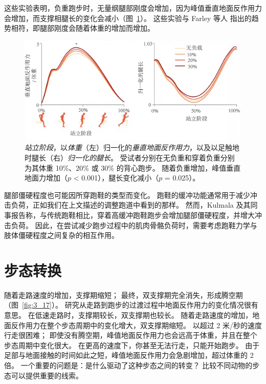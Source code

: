这些实验表明，负重跑步时，无量纲腿部刚度会增加，因为峰值垂直地面反作用力会增加，而支撑相腿长的变化会减小（图~\ref{fig:3_16}）。
这些实验与 Farley 等人\cite{farley1993running} 指出的趋势相符，即腿部刚度会随着体重的增加而增加。

\begin{figure}[!htb]
	\centering
	\includegraphics[width=1.0\linewidth]{chap3/3_16}
	\caption{\textit{站立阶段}，以\textit{体重}（左）归一化的\textit{垂直地面反作用力}，以及以足触地时腿长（右）\textit{归一化的腿长}。
		受试者分别在无负重和穿着负重分别为其体重 10\%、20\% 或 30\% 的背心跑步。
		随着负重增加，峰值垂直地面力增加（$p$ < 0.001），腿长变化减小（$p$ = 0.025）\cite{silder2015running}。 \label{fig:3_16}}
\end{figure}

腿部僵硬程度也可能因所穿跑鞋的类型而变化。
跑鞋的缓冲功能通常用于减少冲击负荷，正如我们在上文描述的调整跑道中看到的那样。
然而，Kulmala 及其同事\cite{kulmala2018running}报告称，与传统跑鞋相比，穿着高缓冲跑鞋跑步会增加腿部僵硬程度，并增大冲击负荷。
因此，在尝试减少跑步过程中的肌肉骨骼负荷时，需要考虑跑鞋力学与肢体僵硬程度之间复杂的相互作用。


\section{步态转换}

随着走路速度的增加，支撑期缩短；
最终，双支撑期完全消失，形成腾空期（图~\ref{fig:3_17}）。
研究从走路到跑步的过渡过程中地面反作用力的变化情况很有意思。
在低速走路时，支撑期较长，双支撑期也较长。
随着走路速度的增加，地面反作用力在整个步态周期中的变化增大，双支撑期缩短。
以超过 2 米/秒的速度行走很困难；
即使没有腾空期，峰值地面反作用力也会远高于体重，并且在整个步态周期中变化很大。
在更高的速度下，你甚至无法行走，只能开始跑步。
由于足部与地面接触的时间如此之短，峰值地面反作用力会急剧增加，超过体重的 2 倍。
一个重要的问题是：是什么驱动了这种步态之间的转变？
比较不同动物的步态可以提供重要的线索。


